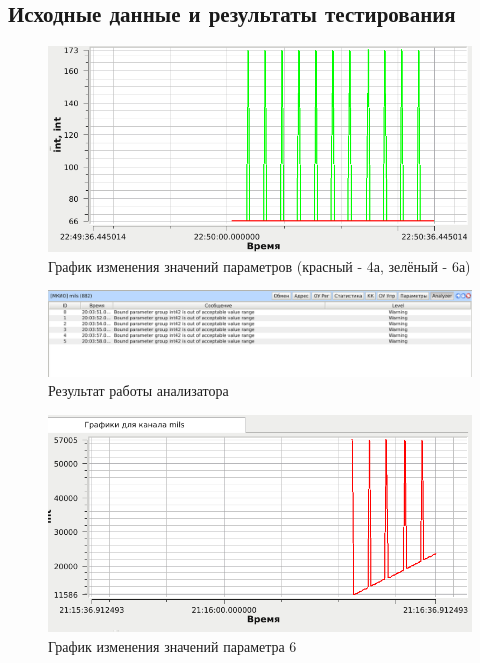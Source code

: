 \subsection*{Исходные данные и результаты тестирования}

\begin{figure}[H]
 \centering
 \includegraphics[scale=0.6]{tests/param_bind/graph}
 \caption{График изменения значений параметров (красный - 4а, зелёный - 6а)}
 \label{fig:param_bind_graph}
\end{figure}

\begin{figure}[H]
 \centering
 \includegraphics[scale=0.4]{tests/param_bind/report}
 \caption{Результат работы анализатора}
 \label{fig:param_bind_report}
\end{figure}



\begin{figure}[H]
 \centering
 \includegraphics[scale=0.6]{tests/param_error_value/graph}
 \caption{График изменения значений параметра 6}
 \label{fig:param_error_value_graph}
\end{figure}

